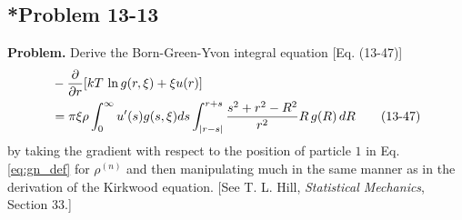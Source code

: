 \documentclass[twocolumn, 10pt]{article}
\numberwithin{equation}{section}
\newenvironment{problem}
{\par\medskip \color{problemblue}
  \textbf{Problem. }\ignorespaces}
{\medskip}
\begin{document}
\subsection{*Problem 13-13}

\begin{problem}
  Derive the Born-Green-Yvon integral equation [Eq. (13-47)]
  \begin{align}
    &-\frac{\partial}{\partial r}
    [kT \, \ln g(r, \xi) + \xi u(r)]
    \notag
    \\
    &=
    \pi\xi\rho\int_0^\infty u'(s) g(s, \xi) ds
    \int_{|r-s|}^{r+s}
    \frac{ s^2 + r^2 - R^2 }{ r^2 }
    R \,  g(R) \, dR
    \tag{13-47}
  \end{align}
  by taking the gradient with respect to the position of particle $1$
  in Eq. \eqref{eq:gn_def}
  for $\rho^{(n)}$ and then manipulating much in the same manner
  as in the derivation of the Kirkwood equation.
  [See T. L. Hill, \textit{Statistical Mechanics}, Section 33.]
\end{problem}
\end{document}
